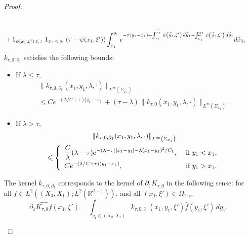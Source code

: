 \documentclass[AHL,Unicode,longabstracts]{cedram}
\newcommand*\R{\mathbb{R}}
\newcommand*\ds{\displaystyle}
\renewcommand{\leq}{\leqslant}
\renewcommand{\tilde}{\widetilde}
\let\oldtilde\tilde
\renewcommand*{\tilde}[1]{\mathchoice{\widetilde{#1}}{\widetilde{#1}}{\oldtilde{#1}}{\oldtilde{#1}}}
\begin{document}
\begin{proof}
\begin{lemm}
\begin{multline}
\begin{aligned}
\\
& + 1_{\psi(x_1, \xi')\,\leq\,\tau}\; 1_{x_1\,<\,y_1} \left(\tau - \psi(x_1, \xi')\right) \int_{x_1}^{y_1} e^{-\tau(y_1-x_1) + \int_{x_1}^{\tilde x_1} \psi\left(\tilde y_1, \xi'\right) \, d\tilde y_1 - \int_{\tilde x_1}^{y_1} \psi\left(\tilde y_1, \xi'\right) \, d\tilde y_1} d\tilde x_1,
\end{aligned}
\end{multline}
$k_{\tau,0,\partial_1}$ satisfies the following bounds:
\begin{itemize}
\item If $\lambda \leq \tau$,
\begin{multline}\label{Est-k-tau-0-d1-x1-y1-Low-Freq}
\|k_{\tau, 0, \partial_1}(x_1,y_1,\lambda, \cdot) \|_{L^\infty\left(\Sigma_{x_1}\right)}\\
\leq C e^{-(\lambda/C+\tau)|y_1 -x_1|} + (\tau -\lambda)
\| k_{\tau,0}(x_1, y_1,\lambda, \cdot)\|_{L^\infty\left(\Sigma_{x_1}\right)}.
\end{multline}
\item If $\lambda > \tau$,
\begin{multline}\label{Est-k-tau-0-d1-x1-y1-High-Freq}
\|k_{\tau, 0, \partial_1}(x_1,y_1,\lambda, \cdot) \|_{L^\infty\left(\Sigma_{x_1}\right)}\\
\leq
\left\{
\begin{array}{ll}
\ds
\frac{C}{\lambda} (\lambda - \tau) e^{-(\lambda-\tau) |x_1-y_1|- \lambda (x_1-y_1)^2/C_1}, & \text{ if } y_1<x_1,
\smallskip
\\
\ds C e^{-(\lambda/C + \tau)(y_1 - x_1)}, & \text{ if } y_1>x_1.
\end{array}
\right.
\end{multline}
\end{itemize}
\end{lemm}

\begin{rema}
The kernel $k_{\tau,0, \partial_1}$ corresponds to the kernel of $\partial_1 K_{\tau,0}$ in the following sense: for all $f \in L^2((X_0,X_1); L^2(\R^{d-1}))$, and all $(x_1, \xi') \in \Omega_{1, \tau}$,
\begin{equation}\label{d1-Hat-K}
\partial_1 \widehat{K_{\tau, 0} f}(x_1,\xi') = \int_{y_1 \in (X_0,X_1)} k_{\tau,0, \partial_1}(x_1, y_1, \xi') \widehat f(y_1, \xi') \, dy_1.
\end{equation}
\end{rema}


\end{proof}
\end{document}

